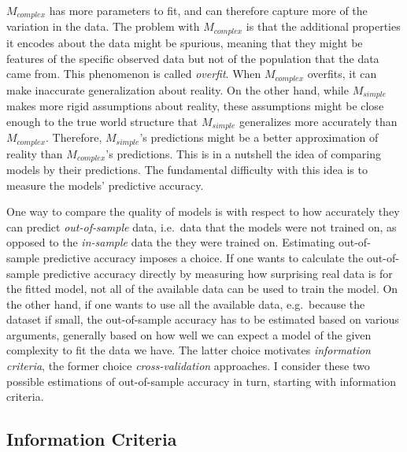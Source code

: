 \documentclass[a4paper,12pt,twoside]{article}
\begin{document}
$M_{complex}$ has more parameters to fit, and can therefore capture more of the variation in the data. The problem with  $M_{complex}$ is that the additional properties it encodes about the data might be spurious, meaning that they might be features of the specific observed data but not of the population that the data came from. This phenomenon is called \textit{overfit}. When  $M_{complex}$ overfits, it can make inaccurate generalization about reality. On the other hand, while $M_{simple}$ makes more rigid assumptions about reality, these assumptions might be close enough to the true world structure that $M_{simple}$ generalizes more accurately than $M_{complex}$. Therefore, $M_{simple}$'s predictions might be a better approximation of reality than $M_{complex}$'s predictions. This is in a nutshell the idea of comparing models by their predictions. The fundamental difficulty with this idea is to measure the models' predictive accuracy.

One way to compare the quality of models is with respect to how accurately they can predict \textit{out-of-sample} data, i.e.\ data that the models were not trained on, as opposed to the \textit{in-sample} data the they were trained on. Estimating out-of-sample predictive accuracy imposes a choice. If one wants to calculate the out-of-sample predictive accuracy directly by measuring how surprising real data is for the fitted model, not all of the available data can be used to train the model. On the other hand, if one wants to use all the available data, e.g.\ because the dataset if small, the out-of-sample accuracy has to be estimated based on various arguments, generally based on how well we can expect a model of the given complexity to fit the data we have. The latter choice motivates \textit{information criteria}, the former choice \textit{cross-validation} approaches. I consider these two possible estimations of out-of-sample accuracy in turn, starting with information criteria.

\subsection{Information Criteria}
\end{document}
